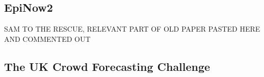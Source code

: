 \documentclass[10pt,a4paper,twocolumn]{article}
\begin{document}
\subsection{EpiNow2}

SAM TO THE RESCUE, RELEVANT PART OF OLD PAPER PASTED HERE AND COMMENTED OUT
% 

\subsection*{The UK Crowd Forecasting Challenge}
\end{document}
